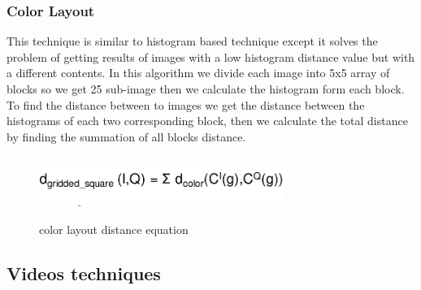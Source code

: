   \vskip 0.2in
\subsubsection{Color Layout}
This technique is similar to histogram based technique except it solves the problem of getting results of images with a low 
histogram distance value but with a different contents.
\vskip 0.2in
In this algorithm we divide each image into 5x5 array of blocks so we get 25 sub-image then we calculate the histogram form each block.
To find the distance between to images we get the distance between the histograms of each two corresponding block, 
then we calculate the total distance by finding the summation of all blocks distance.
\vskip 0.2in

\begin{figure}[H]
    \centering
    \includegraphics[width=80mm,height=20mm]{Images/cl.png}
    \caption{color layout distance equation}
  \end{figure}
  
  \vskip 0.2in

\subsection{Videos techniques}


